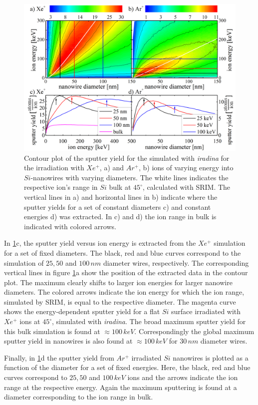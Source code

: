 \begin{figure}[th]
	\centering
		\includegraphics[width=.9\textwidth]{images/sputtering_diameter_energy.png}
	\caption{Contour plot of the sputter yield for the simulated with \emph{iradina} for the irradiation with $Xe^+$, a) and $Ar^+$, b) ions of varying energy into $Si$-nanowires with varying diameters. The white lines indicates the respective ion's range in $Si$ bulk at $45^\circ$, calculated with SRIM. The vertical lines in a) and horizontal lines in b) indicate where the sputter yields for a set of constant diameters c) and constant energies d) was extracted. In c) and d) the ion range in bulk is indicated with colored arrows.} 
	\label{sputtering_de}
\end{figure} 

In \ref{sputtering_de}c, the sputter yield versus ion energy is extracted from the $Xe^+$ simulation for a set of fixed diameters. The black, red and blue curves correspond to the simulation of $25, 50$ and $100\,nm$ diameter wires, respectively. The corresponding vertical lines in figure \ref{sputtering_de}a show the position of the extracted data in the contour plot. The maximum clearly shifts to larger ion energies for larger nanowire diameters. The colored arrows indicate the ion energy for which the ion range, simulated by SRIM, is equal to the respective diameter. The magenta curve shows the energy-dependent sputter yield for a flat $Si$ surface irradiated with $Xe^+$ ions at $45^\circ$, simulated with \emph{iradina}. The broad maximum sputter yield for this bulk simulation is found at $\approx 100 \,keV$. Correspondingly the global maximum sputter yield in nanowires is also found at $\approx 100 \,keV$ for $30\,nm$ diameter wires.

Finally, in \ref{sputtering_de}d the sputter yield from $Ar^+$ irradiated $Si$ nanowires is plotted as a function of the diameter for a set of fixed energies. Here, the black, red and blue curves correspond to $25, 50$ and $100\,keV$ ions and the arrows indicate the ion range at the respective energy. Again the maximum sputtering is found at a diameter corresponding to the ion range in bulk.

